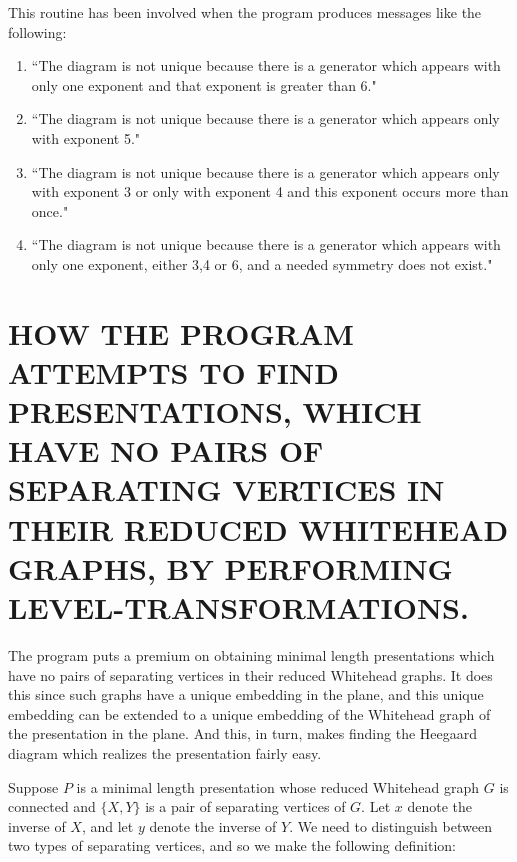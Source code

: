 \documentclass[12pt]{amsart}
\begin{document}
        This routine has been involved when the program produces messages like the following:
        \begin{enumerate}        
               \item       ``The diagram is not unique because there is a generator which appears with
                        only one exponent and that exponent is greater than 6."
                        
                \item       ``The diagram is not unique because there is a generator which appears only
                        with exponent 5."
                        
                \item       ``The diagram is not unique because there is a generator which appears only with
                        exponent 3 or only with exponent 4 and this exponent occurs more than once."
                        
                \item ``The diagram is not unique because there is a generator which appears with only
                        one exponent, either 3,4 or 6, and a needed symmetry does not exist."
        \end{enumerate}

\section{HOW THE PROGRAM ATTEMPTS TO FIND PRESENTATIONS, WHICH HAVE NO PAIRS OF SEPARATING VERTICES IN THEIR REDUCED WHITEHEAD GRAPHS, BY PERFORMING LEVEL-TRANSFORMATIONS.}

        
                The program puts a premium on obtaining minimal length presentations which have no
        pairs of separating vertices in their reduced Whitehead graphs. It does this since such
        graphs have a unique embedding in the plane, and this unique embedding can be extended
        to a unique embedding of the Whitehead graph of the presentation in the plane. And this,
        in turn, makes finding the Heegaard diagram which realizes the presentation fairly easy.
                
                Suppose $P$ is a minimal length presentation whose reduced Whitehead graph $G$ is
        connected and $\{ X, Y\}$ is a pair of separating vertices of $G$. Let $x$ denote the inverse of $X$,
        and let $y$ denote the inverse of $Y$. We need to distinguish between two types of separating
        vertices, and so we make the following definition:
        
\end{document}
